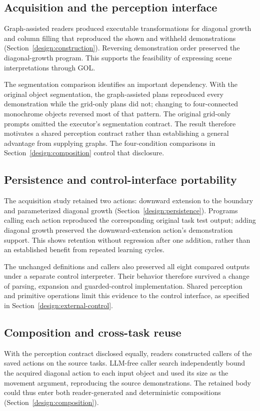 \documentclass[11pt]{article}
\begin{document}
\subsection{Acquisition and the perception interface}
Graph-assisted readers produced executable transformations for diagonal growth and column filling that reproduced the shown and withheld demonstrations (Section~\ref{design:construction}). Reversing demonstration order preserved the diagonal-growth program. This supports the feasibility of expressing scene interpretations through GOL.

The segmentation comparison identifies an important dependency. With the original object segmentation, the graph-assisted plans reproduced every demonstration while the grid-only plans did not; changing to four-connected monochrome objects reversed most of that pattern. The original grid-only prompts omitted the executor's segmentation contract. The result therefore motivates a shared perception contract rather than establishing a general advantage from supplying graphs. The four-condition comparisons in Section~\ref{design:composition} control that disclosure.

\subsection{Persistence and control-interface portability}
The acquisition study retained two actions: downward extension to the boundary and parameterized diagonal growth (Section~\ref{design:persistence}). Programs calling each action reproduced the corresponding original task test output; adding diagonal growth preserved the downward-extension action's demonstration support. This shows retention without regression after one addition, rather than an established benefit from repeated learning cycles.

The unchanged definitions and callers also preserved all eight compared outputs under a separate control interpreter. Their behavior therefore survived a change of parsing, expansion and guarded-control implementation. Shared perception and primitive operations limit this evidence to the control interface, as specified in Section~\ref{design:external-control}.

\subsection{Composition and cross-task reuse}
With the perception contract disclosed equally, readers constructed callers of the saved actions on the source tasks. LLM-free caller search independently bound the acquired diagonal action to each input object and used its size as the movement argument, reproducing the source demonstrations. The retained body could thus enter both reader-generated and deterministic compositions (Section~\ref{design:composition}).
\end{document}

